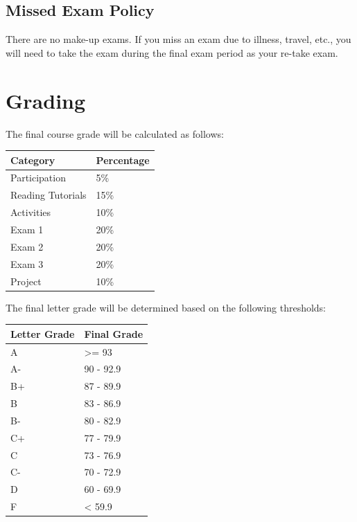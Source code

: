 \documentclass[
  letterpaper,
  DIV=11,
  numbers=noendperiod]{scrreprt}
\begin{document}
\hypertarget{missed-exam-policy}{%
\subsection*{Missed Exam Policy}\label{missed-exam-policy}}

There are no make-up exams. If you miss an exam due to illness, travel,
etc., you will need to take the exam during the final exam period as
your re-take exam.

\hypertarget{grading}{%
\section*{Grading}\label{grading}}

The final course grade will be calculated as follows:

\begin{longtable}[]{@{}ll@{}}
\toprule()
Category & Percentage \\
\midrule()
\endhead
Participation & 5\% \\
Reading Tutorials & 15\% \\
Activities & 10\% \\
Exam 1 & 20\% \\
Exam 2 & 20\% \\
Exam 3 & 20\% \\
Project & 10\% \\
\bottomrule()
\end{longtable}

The final letter grade will be determined based on the following
thresholds:

\begin{longtable}[]{@{}ll@{}}
\toprule()
Letter Grade & Final Grade \\
\midrule()
\endhead
A & \textgreater= 93 \\
A- & 90 - 92.9 \\
B+ & 87 - 89.9 \\
B & 83 - 86.9 \\
B- & 80 - 82.9 \\
C+ & 77 - 79.9 \\
C & 73 - 76.9 \\
C- & 70 - 72.9 \\
D & 60 - 69.9 \\
F & \textless{} 59.9 \\
\bottomrule()
\end{longtable}
\end{document}

